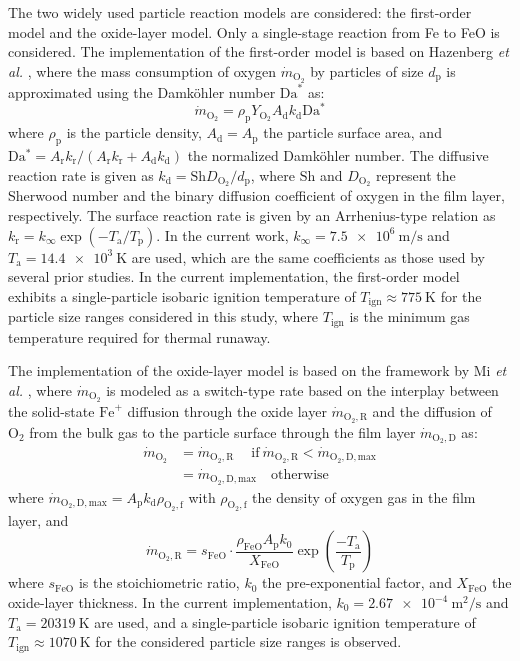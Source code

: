 \documentclass[twocolumn,9pt]{article} %
\newcommand{\mrm}[1]{\mathrm{#1}}
\begin{document}
The two widely used particle reaction models are considered: the first-order model and the oxide-layer model. Only a single-stage reaction from Fe to FeO is considered. The implementation of the first-order model is based on Hazenberg \emph{et al.} \cite{Hazenberg}, where the mass consumption of oxygen $\dot{m}_\mrm{O_2}$ by particles of size $d_\mrm{p}$ is approximated using the Damk\"ohler number $\mrm{Da}^*$ as:
\begin{equation}
    \dot{m}_\mrm{O_2} = \rho_\mrm{p}Y_\mrm{O_2}A_\mrm{d}k_\mrm{d}\mrm{Da^*} \label{eq:dam}
\end{equation}
where $\rho_\mrm{p}$ is the particle density, $A_\mrm{d} = A_\mrm{p}$ the particle surface area, and $\mrm{Da^*} = A_\mrm{r}k_\mrm{r}/(A_\mrm{r}k_\mrm{r} + A_\mrm{d}k_\mrm{d})$ the normalized Damk\"ohler number. The diffusive reaction rate is given as $k_\mrm{d} = \mrm{Sh} D_\mrm{O_2}/ d_\mrm{p}$, where $\mrm{Sh}$ and $D_\mrm{O_2}$ represent the Sherwood number and the binary diffusion coefficient of oxygen in the film layer, respectively. The surface reaction rate is given by an Arrhenius-type relation as $k_\mrm{r} = k_\infty \exp(-T_\mrm{a}/T_\mrm{p})$. In the current work, $k_\infty = \SI{7.5e6}{\meter/\second}$ and $T_\mrm{a}=\SI{14.4e3}{\kelvin}$ are used, which are the same coefficients as those used by several prior studies. In the current implementation, the first-order model exhibits a single-particle isobaric ignition temperature of $T_\mrm{ign}\approx\SI{775}{\kelvin}$ for the particle size ranges considered in this study, where $T_\mrm{ign}$ is the minimum gas temperature required for thermal runaway.

The implementation of the oxide-layer model is based on the framework by Mi \emph{et al.} \cite{Mi2022}, where $\dot{m}_\mrm{O_2}$ is modeled as a switch-type rate based on the interplay between the solid-state $\mrm{Fe}^+$ diffusion through the oxide layer $\dot{m}_\mrm{O_2,R}$ and the diffusion of $\mrm{O}_2$ from the bulk gas to the particle surface through the film layer $\dot{m}_\mrm{O_2,D}$ as:
\begin{equation}
    \begin{split}
        \dot{m}_\mrm{O_2} &= \dot{m}_\mrm{O_2,R}\quad\: \mrm{if}\ \dot{m}_\mrm{O_2,R}<\dot{m}_\mrm{O_2,D,max} \\
        &= \dot{m}_\mrm{O_2,D,max} \quad \mrm{otherwise} 
    \end{split}
\end{equation}
where $\dot{m}_\mrm{O_2,D,max} = A_\mrm{p}k_\mrm{d}\rho_\mrm{O_2,f}$ with $\rho_\mrm{O_2,f}$ the density of oxygen gas in the film layer, and 
\begin{equation}
    \dot{m}_\mrm{O_2,R} = s_\mrm{FeO} \cdot\frac{\rho_\mrm{FeO} A_\mrm{p} k_\mrm{0}}{X_\mrm{FeO}} \exp \left( \frac{-T_\mrm{a}}{T_\mrm{p}}\right)
\end{equation}
where $s_\mrm{FeO}$ is the stoichiometric ratio, $k_\mrm{0}$ the pre-exponential factor, and $X_\mrm{FeO}$ the oxide-layer thickness. In the current implementation, $k_0=\SI{2.67e-4}{\meter^2/\second}$ and $T_\mrm{a}=\SI{20319}{\kelvin}$ are used, and a single-particle isobaric ignition temperature of $T_\mrm{ign}\approx\SI{1070}{\kelvin}$ for the considered particle size ranges is observed. 
\end{document}
